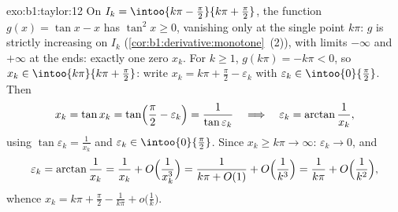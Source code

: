 \begin{solution}{exo:b1:taylor:12}
On $I_k = \intoo{k\pi - \frac\pi2}{k\pi + \frac\pi2}$, the
function $g(x) = \tan x - x$ has  $\tan^2 x \geq 0$,
vanishing only at the single point $k\pi$: $g$ is strictly
increasing on $I_k$ (\cref{cor:b1:derivative:monotone}~(2)),
with limits $-\infty$ and $+\infty$ at the ends: exactly one
zero $x_k$. For $k \geq 1$, $g(k\pi) = -k\pi < 0$, so $x_k \in
\intoo{k\pi}{k\pi + \frac\pi2}$: write $x_k = k\pi + \frac\pi2 -
\varepsilon_k$ with $\varepsilon_k \in \intoo{0}{\frac\pi2}$.
Then
\[
x_k = \tan x_k = \tan\Bigl(\frac\pi2 - \varepsilon_k\Bigr)
= \frac{1}{\tan\varepsilon_k}
\quad\Longrightarrow\quad
\varepsilon_k = \arctan\frac{1}{x_k} ,
\]
using $\tan\varepsilon_k = \frac{1}{x_k}$ and $\varepsilon_k \in
\intoo{0}{\frac\pi2}$. Since $x_k \geq k\pi \to \infty$:
$\varepsilon_k \to 0$, and
\[
\varepsilon_k = \arctan\frac{1}{x_k} = \frac{1}{x_k} +
O\Bigl(\frac{1}{x_k^3}\Bigr)
= \frac{1}{k\pi + O(1)} + O\Bigl(\frac{1}{k^3}\Bigr)
= \frac{1}{k\pi} + O\Bigl(\frac{1}{k^2}\Bigr) ,
\]
whence $x_k = k\pi + \frac\pi2 - \frac{1}{k\pi} +
o\bigl(\frac1k\bigr)$.
\end{solution}

